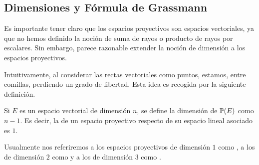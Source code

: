\subsection{Dimensiones y Fórmula de Grassmann}
Es importante tener claro que los espacios proyectivos  son espacios vectoriales, ya que no hemos definido la noción de suma de rayos o producto de rayos por escalares. Sin embargo, parece razonable extender la noción de dimensión a los espacios proyectivos.

Intuitivamente, al considerar las rectas vectoriales como puntos, estamos, entre comillas, perdiendo un grado de libertad. Esta idea es recogida por la siguiente definición. 
\begin{defi}
	\label{C1_def_dimension}
	Si $E$ es un espacio vectorial de dimensión $n$, se define la dimensión de $\mathbb{P}(E)$ como $n-1$. Es decir, la  de un espacio proyectivo respecto de su espacio lineal asociado es $1$.
\end{defi}

Usualmente nos referiremos a los espacios proyectivos de dimensión $1$ como , a los de dimensión $2$ como  y a los de dimensión $3$ como .

